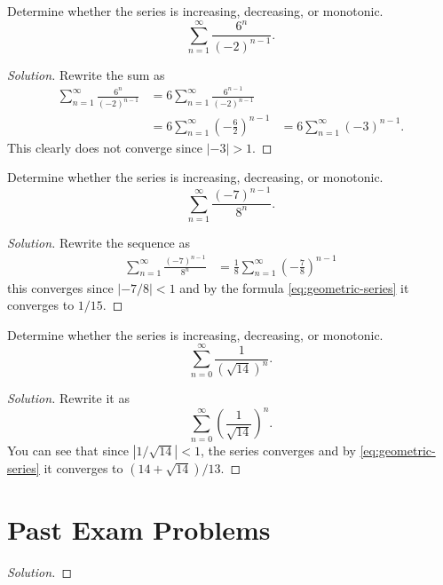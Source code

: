 \begin{problem}[HW 20, \# 7]
Determine whether the series is increasing, decreasing, or monotonic.
\[
\sum_{n=1}^\infty \frac{6^n}{(-2)^{n-1}}.
\]
\end{problem}
\begin{proof}[Solution]
Rewrite the sum as
\begin{align*}
\sum_{n=1}^\infty \frac{6^n}{(-2)^{n-1}}
&=6\sum_{n=1}^\infty \frac{6^{n-1}}{(-2)^{n-1}}\\
&=6\sum_{n=1}^\infty \left(-\frac{6}{2}\right)^{n-1}
&=6\sum_{n=1}^\infty \left(-3\right)^{n-1}.
\end{align*}
This clearly does not converge since $|-3|>1$.
\end{proof}

\begin{problem}[HW 20, \# 8]
Determine whether the series is increasing, decreasing, or monotonic.
\[
\sum_{n=1}^\infty\frac{(-7)^{n-1}}{8^n}.
\]
\end{problem}
\begin{proof}[Solution]
Rewrite the sequence as
\begin{align*}
\sum_{n=1}^\infty\frac{(-7)^{n-1}}{8^n}
&=\frac{1}{8}\sum_{n=1}^\infty\left(-\frac{7}{8}\right)^{n-1}
\end{align*}
this converges since $|-7/8|<1$ and by the formula
\eqref{eq:geometric-series} it converges to $1/15$.
\end{proof}

\begin{problem}[HW 20, \# 9]
Determine whether the series is increasing, decreasing, or monotonic.
\[
\sum_{n=0}^\infty\frac{1}{\left(\sqrt{14}\right)^n}.
\]
\end{problem}
\begin{proof}[Solution]
Rewrite it as
\[
\sum_{n=0}^\infty\left(\frac{1}{\sqrt{14}}\right)^n.
\]
You can see that since $\left|1/\sqrt{14}\right|<1$, the series converges
and by \eqref{eq:geometric-series} it converges to
$\left(14+\sqrt{14}\right)/13$.
\end{proof}

\chapter{Past Exam Problems}
\begin{problem}
\end{problem}
\begin{proof}[Solution]
\end{proof}

